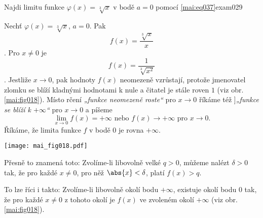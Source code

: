 \begin{mathexam}{Najdi limitu funkce \(\varphi(x) = \sqrt[3]{x}\) v bodě \(a = 0\) pomocí
  \eqref{mai:eq037}}{exam029} 
   
  Nechť \(\varphi(x) = \sqrt[3]{x}\), \(a = 0\). Pak \[f(x) = \dfrac{\sqrt[3]{x}}{x}\]. Pro \(x \neq
  0\) je \[f(x) = \frac{1}{\sqrt[3]{x^2}}\]. Jestliže \(x \to 0\), pak hodnoty \(f(x)\) neomezeně
  vzrůstají, protože jmenovatel zlomku se blíží kladnými hodnotami k nule a čitatel je stále roven
  \(1\) (viz obr. \ref{mai:fig018}). Místo rčení \emph{„funkce neomezeně roste“} pro \(x \to 0\)
  říkáme též ]\emph{„funkce se blíží k \(+\infty\)“} pro \(x \to 0\) a píšeme 
  \begin{equation*}
    \lim\limits_{x\to 0} f(x) = +\infty \text{ nebo } f(x)\to +\infty\text{ pro } x\to0.
  \end{equation*}
  Říkáme, že limita funkce \(f\) v bodě \(0\) je rovna \(+\infty\). 
    
  {\centering
  \captionsetup{type=figure}
%   
  \texttt{[image: mai\_fig018.pdf]}
  \par}
  
  Přesně to znamená toto: Zvolíme-li libovolně velké \(q > 0\), můžeme nalézt \(\delta > 0\) tak, že
  pro každé \(x \neq 0\), pro něž \(\abs{x} < \delta\), platí \(f(x) > q\). 
  
  To lze říci i takto: Zvolíme-li libovolně okolí bodu \(+\infty\), existuje okolí bodu \(0\) tak,
  že pro každé \(x \neq 0\) z tohoto okolí je \(f(x)\) ve zvoleném okolí \(+\infty\) (viz obr.
  \ref{mai:fig018}).
\end{mathexam}















